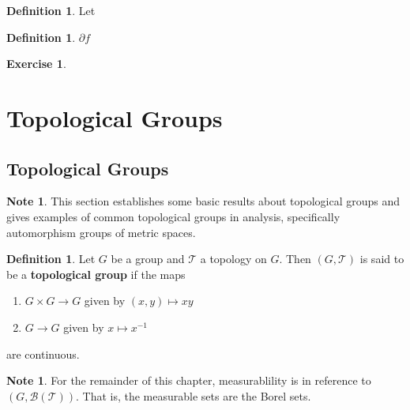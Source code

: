 \documentclass[12pt]{amsart}
\theoremstyle{definition}
\newtheorem{defn}[definition]{Definition}
\newtheorem{note}[definition]{Note}
\newtheorem{ex}[definition]{Exercise}
\newcommand{\MB}{\mathcal{B}}
\newcommand{\MT}{\mathcal{T}}
\newcommand{\tbf}[1]{\textbf{#1}}
\DeclareMathOperator*{\0}{\mbf{0}}
\DeclareMathOperator*{\1}{\mbf{1}}
\newcommand{\lex}[1]{\label{ex:#1}}
\newcommand{\ld}[1]{\label{defn:#1}}
\begin{document}
	
	
	
	
	
	
	
	\begin{defn} \ld{}
	Let 
	\end{defn}
	
	\begin{defn} \ld{}
	$\partial f$
	\end{defn}	
	
	\begin{ex} \lex{}
	
	\end{ex}
	
	
	
	
	
	
	
	
	
	
	
	
	
	
	
	
	
	
	
	
	
	\newpage
	\section{Topological Groups}
	
	
	
	\subsection{Topological Groups}
	\begin{note}
	This section establishes some basic results about topological groups and gives examples of common topological groups in analysis, specifically automorphism groups of metric spaces.  
	\end{note}
	
	\begin{defn} \ld{00000} 
		Let $G$ be a group and $\MT$ a topology on $G$. Then $(G, \MT)$ is said to be a \tbf{topological group} if the maps \begin{enumerate}
			\item $G \times G \rightarrow G$ given by $(x,y) \mapsto xy$
			\item  $G \rightarrow G$ given by $x \mapsto x^{-1}$ 
		\end{enumerate} are continuous.
	\end{defn}

	\begin{note}
		For the remainder of this chapter, measurablility is in reference to $(G, \MB(\MT))$. That is, the measurable sets are the Borel sets.
	\end{note}
	
\end{document}
